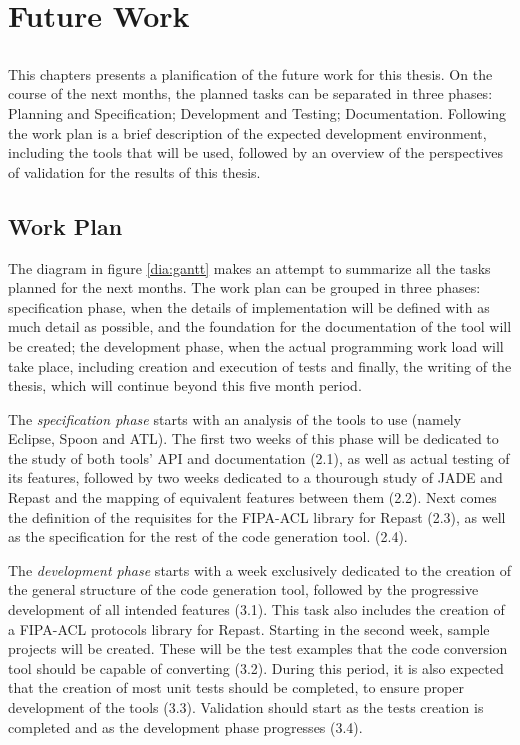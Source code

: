 \chapter{Future Work}
\label{chap:plan}

\section*{}

This chapters presents a planification of the future work for this thesis. On the course of the next months, the planned tasks can be separated in three phases: Planning and Specification; Development and Testing; Documentation.
Following the work plan is a brief description of the expected development environment, including the tools that will be used, followed by an overview of the perspectives of validation for the results of this thesis.

\section{Work Plan}

The diagram in figure \ref{dia:gantt} makes an attempt to summarize all the tasks planned for the next months. The work plan can be grouped in three phases: specification phase, when the details of implementation will be defined with as much detail as possible, and the foundation for the documentation of the tool will be created; the development phase, when the actual programming work load will take place, including creation and execution of tests and finally, the writing of the thesis, which will continue beyond this five month period.

The \emph{specification phase} starts with an analysis of the tools to use (namely Eclipse, Spoon and ATL). The first two weeks of this phase will be dedicated to the study of both tools' API and documentation (2.1), as well as actual testing of its features, followed by two weeks dedicated to a thourough study of JADE and Repast and the mapping of equivalent features between them (2.2). Next comes the definition of the requisites for the FIPA-ACL library for Repast (2.3), as well as the specification for the rest of the code generation tool. (2.4).

The \emph{development phase} starts with a week exclusively dedicated to the creation of the general structure of the code generation tool, followed by the progressive development of all intended features (3.1). This task also includes the creation of a FIPA-ACL protocols library for Repast. Starting in the second week, sample projects will be created. These will be the test examples that the code conversion tool should be capable of converting (3.2). During this period, it is also expected that the creation of most unit tests should be completed, to ensure proper development of the tools (3.3). Validation should start as the tests creation is completed and as the development phase progresses (3.4).


